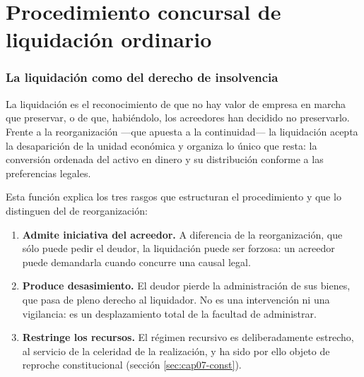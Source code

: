 \chapter{Procedimiento concursal de liquidación ordinario}
\label{cap:liquidacion-ordinaria}


\bloqueTeorico

\subsection{La liquidación como  del derecho de insolvencia}

La liquidación es el reconocimiento de que no hay valor de empresa en marcha que preservar,
o de que, habiéndolo, los acreedores han decidido no preservarlo. Frente a la
reorganización ---que apuesta a la continuidad--- la liquidación acepta la desaparición de
la unidad económica y organiza lo único que resta: la conversión ordenada del activo en
dinero y su distribución conforme a las preferencias legales.

Esta función explica los tres rasgos que estructuran el procedimiento y que lo distinguen
del de reorganización:

\begin{enumerate}
  \item \textbf{Admite iniciativa del acreedor.} A diferencia de la reorganización, que
  sólo puede pedir el deudor, la liquidación puede ser forzosa: un acreedor puede
  demandarla cuando concurre una causal legal.

  \item \textbf{Produce desasimiento.} El deudor pierde la administración de sus bienes,
  que pasa de pleno derecho al liquidador. No es una intervención ni una vigilancia: es un
  desplazamiento total de la facultad de administrar.

  \item \textbf{Restringe los recursos.} El régimen recursivo es deliberadamente estrecho,
  al servicio de la celeridad de la realización, y ha sido por ello objeto de reproche
  constitucional (sección \ref{sec:cap07-const}).
\end{enumerate}

